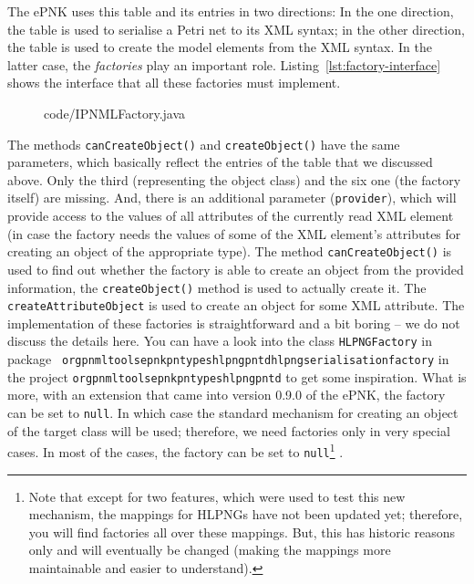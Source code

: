 The ePNK uses this table and its entries in two directions: In the one
direction, the table is used to serialise a Petri net to its XML
syntax; in the other direction, the table is used to create the model
elements from the XML syntax.
In the latter case, the \emph{factories}%
play an important role. Listing~\ref{lst:factory-interface} shows the interface
that all these factories must implement.
%
\begin{figure}[htbp!]
%
{code/IPNMLFactory.java}
\end{figure}
%
The methods {\tt canCreateObject()}%
and {\tt createObject()}%
have the same parameters, which basically reflect the entries of the table that
we discussed above. Only the third (representing the object class) and the six one
(the factory itself) are missing. And, there is an additional parameter
({\tt provider}), which will provide access to the values of all attributes of
the currently read XML element (in case the factory needs the values of some
of the XML element's attributes for creating an object of the appropriate type).
The method {\tt canCreateObject()} is used to find out whether the factory is able
to create an object from the provided information, the {\tt createObject()}
method is used to actually create it. The {\tt createAttributeObject} is
used to create an object for some XML attribute. The implementation of these
factories is straightforward and a bit boring -- we do not discuss the
details here. You can have a look into the class {\tt HLPNGFactory}
in package {\tt
org\qnsep{}pnml\qnsep{}tools\qnsep{}epnk\qnsep{}pntypes\qnsep{}hlpng\qnsep{}pntd\qnsep{}hlpngserialisation\qnsep{}factory}
in the project {\tt org\qnsep{}pnml\qnsep{}tools\qnsep{}epnk\qnsep{}pntypes\qnsep{}hlpng\qnsep{}pntd} to get some
inspiration. What is more, with an extension that came into version 0.9.0
of the ePNK, the factory can be set to {\tt null}. In which case the
standard mechanism for creating an object of the target class will
be used; therefore, we need factories only in very special
cases. In most of the cases, the factory can be set to {\tt null}\footnote
  {Note that except for two features, which were used to test this
   new mechanism, the mappings for HLPNGs have not been updated 
   yet; therefore, you will find factories all over these mappings.
   But, this has historic reasons only and will eventually be
   changed (making the mappings more maintainable and easier to understand).}%
.


